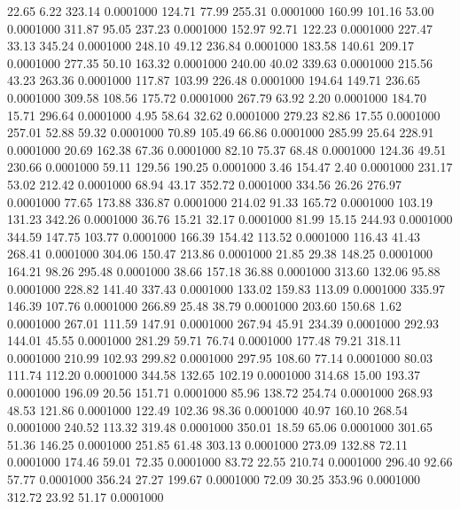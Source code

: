   22.65    6.22  323.14   0.0001000
 124.71   77.99  255.31   0.0001000
 160.99  101.16   53.00   0.0001000
 311.87   95.05  237.23   0.0001000
 152.97   92.71  122.23   0.0001000
 227.47   33.13  345.24   0.0001000
 248.10   49.12  236.84   0.0001000
 183.58  140.61  209.17   0.0001000
 277.35   50.10  163.32   0.0001000
 240.00   40.02  339.63   0.0001000
 215.56   43.23  263.36   0.0001000
 117.87  103.99  226.48   0.0001000
 194.64  149.71  236.65   0.0001000
 309.58  108.56  175.72   0.0001000
 267.79   63.92    2.20   0.0001000
 184.70   15.71  296.64   0.0001000
   4.95   58.64   32.62   0.0001000
 279.23   82.86   17.55   0.0001000
 257.01   52.88   59.32   0.0001000
  70.89  105.49   66.86   0.0001000
 285.99   25.64  228.91   0.0001000
  20.69  162.38   67.36   0.0001000
  82.10   75.37   68.48   0.0001000
 124.36   49.51  230.66   0.0001000
  59.11  129.56  190.25   0.0001000
   3.46  154.47    2.40   0.0001000
 231.17   53.02  212.42   0.0001000
  68.94   43.17  352.72   0.0001000
 334.56   26.26  276.97   0.0001000
  77.65  173.88  336.87   0.0001000
 214.02   91.33  165.72   0.0001000
 103.19  131.23  342.26   0.0001000
  36.76   15.21   32.17   0.0001000
  81.99   15.15  244.93   0.0001000
 344.59  147.75  103.77   0.0001000
 166.39  154.42  113.52   0.0001000
 116.43   41.43  268.41   0.0001000
 304.06  150.47  213.86   0.0001000
  21.85   29.38  148.25   0.0001000
 164.21   98.26  295.48   0.0001000
  38.66  157.18   36.88   0.0001000
 313.60  132.06   95.88   0.0001000
 228.82  141.40  337.43   0.0001000
 133.02  159.83  113.09   0.0001000
 335.97  146.39  107.76   0.0001000
 266.89   25.48   38.79   0.0001000
 203.60  150.68    1.62   0.0001000
 267.01  111.59  147.91   0.0001000
 267.94   45.91  234.39   0.0001000
 292.93  144.01   45.55   0.0001000
 281.29   59.71   76.74   0.0001000
 177.48   79.21  318.11   0.0001000
 210.99  102.93  299.82   0.0001000
 297.95  108.60   77.14   0.0001000
  80.03  111.74  112.20   0.0001000
 344.58  132.65  102.19   0.0001000
 314.68   15.00  193.37   0.0001000
 196.09   20.56  151.71   0.0001000
  85.96  138.72  254.74   0.0001000
 268.93   48.53  121.86   0.0001000
 122.49  102.36   98.36   0.0001000
  40.97  160.10  268.54   0.0001000
 240.52  113.32  319.48   0.0001000
 350.01   18.59   65.06   0.0001000
 301.65   51.36  146.25   0.0001000
 251.85   61.48  303.13   0.0001000
 273.09  132.88   72.11   0.0001000
 174.46   59.01   72.35   0.0001000
  83.72   22.55  210.74   0.0001000
 296.40   92.66   57.77   0.0001000
 356.24   27.27  199.67   0.0001000
  72.09   30.25  353.96   0.0001000
 312.72   23.92   51.17   0.0001000
